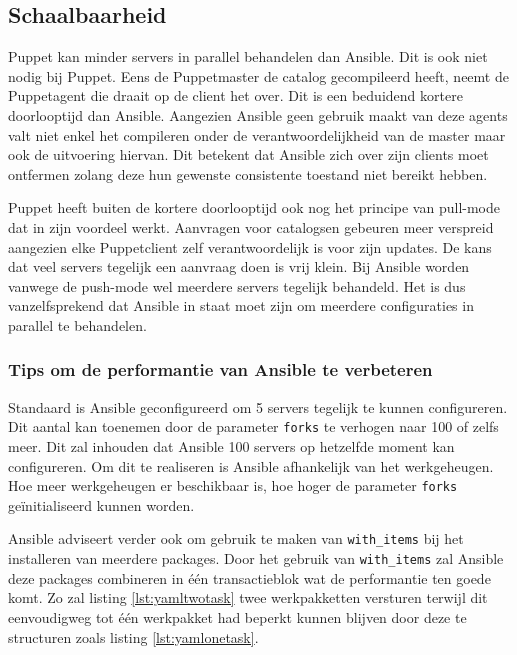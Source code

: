 \subsection{Schaalbaarheid}
\label{sec:schaalbaarheid}

Puppet kan minder servers  in parallel behandelen dan Ansible. Dit is ook niet nodig bij Puppet. Eens de Puppetmaster de \gls{catalog} gecompileerd heeft, neemt de Puppetagent die draait op de client het over. Dit is een beduidend kortere doorlooptijd dan Ansible. Aangezien Ansible geen gebruik maakt van deze agents valt niet enkel het compileren onder de verantwoordelijkheid van de master maar ook de uitvoering hiervan. Dit betekent dat Ansible zich over zijn clients moet ontfermen zolang deze hun gewenste consistente toestand niet bereikt hebben.

Puppet heeft buiten de kortere doorlooptijd ook nog het principe van pull-mode dat in zijn voordeel werkt. Aanvragen voor \gls{catalog}sen gebeuren meer verspreid aangezien elke Puppetclient zelf verantwoordelijk is voor zijn updates. De kans dat veel servers tegelijk een aanvraag doen is vrij klein.  Bij Ansible worden vanwege de push-mode wel meerdere servers tegelijk behandeld. Het is dus vanzelfsprekend dat Ansible in staat moet zijn om meerdere configuraties in parallel te behandelen. 




 \subsubsection{Tips om de performantie van Ansible te verbeteren}
 
 Standaard is Ansible geconfigureerd om 5 servers tegelijk te kunnen configureren. Dit aantal kan toenemen door de parameter \texttt{\gls{fork}s} te verhogen naar 100 of zelfs meer. Dit zal inhouden dat Ansible 100 servers op hetzelfde moment kan configureren. Om dit te realiseren is Ansible afhankelijk van het werkgeheugen. Hoe meer werkgeheugen er beschikbaar is, hoe hoger de parameter \texttt{\gls{fork}s} ge\"initialiseerd kunnen worden.
 
Ansible adviseert verder ook om gebruik te maken van \texttt{with\_items} bij het installeren van meerdere packages. Door het gebruik van \texttt{with\_items} zal Ansible deze packages combineren in \'e\'en transactieblok wat de performantie ten goede komt. Zo zal listing \ref{lst:yamltwotask} twee \gls{werkpakket}ten versturen terwijl dit eenvoudigweg tot \'e\'en \gls{werkpakket}  had beperkt kunnen blijven door deze te structuren zoals listing \ref{lst:yamlonetask}.


